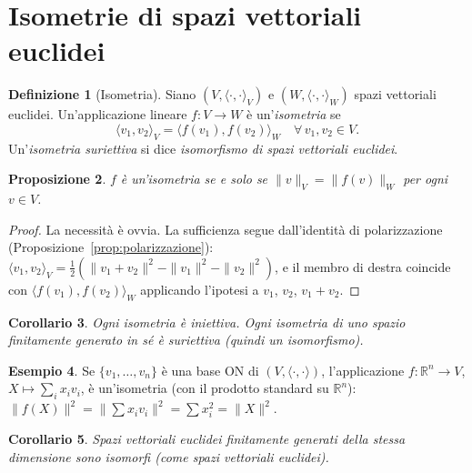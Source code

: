 \documentclass[11pt, a4paper]{book}
\theoremstyle{definition}
\newtheorem{definizione}{Definizione}[section]
\newtheorem{esempio}[definizione]{Esempio}
\theoremstyle{plain}
\newtheorem{proposizione}[definizione]{Proposizione}
\newtheorem{corollario}[definizione]{Corollario}
\theoremstyle{remark}
\newcommand{\R}{\mathbb{R}}
\begin{document}
\section{Isometrie di spazi vettoriali euclidei}
\label{sec:isometrie}

\begin{defbox}
\begin{definizione}[Isometria]
\label{def:isometria}
Siano $(V,\langle\cdot,\cdot\rangle_V)$ e $(W,\langle\cdot,\cdot\rangle_W)$ spazi vettoriali euclidei. Un'applicazione lineare $f \colon V \to W$ è un'\emph{isometria} se
\[
  \langle v_1,v_2\rangle_V = \langle f(v_1),f(v_2)\rangle_W \quad\forall\,v_1,v_2 \in V.
\]
Un'\emph{isometria suriettiva} si dice \emph{isomorfismo di spazi vettoriali euclidei}.
\end{definizione}
\end{defbox}

\begin{proposizione}
\label{prop:isometria-norma}
$f$ è un'isometria se e solo se $\|v\|_V = \|f(v)\|_W$ per ogni $v \in V$.
\end{proposizione}

\begin{proof}
La necessità è ovvia. La sufficienza segue dall'identità di polarizzazione (Proposizione~\ref{prop:polarizzazione}): $\langle v_1,v_2\rangle_V = \frac{1}{2}(\|v_1+v_2\|^2 - \|v_1\|^2 - \|v_2\|^2)$, e il membro di destra coincide con $\langle f(v_1),f(v_2)\rangle_W$ applicando l'ipotesi a $v_1$, $v_2$, $v_1+v_2$.
\end{proof}

\begin{corollario}
Ogni isometria è iniettiva. Ogni isometria di uno spazio finitamente generato in sé è suriettiva (quindi un isomorfismo).
\end{corollario}

\begin{exbox}
\begin{esempio}
Se $\{v_1,\ldots,v_n\}$ è una base ON di $(V,\langle\cdot,\cdot\rangle)$, l'applicazione $f \colon \R^n \to V$, $X \mapsto \sum_i x_i v_i$, è un'isometria (con il prodotto standard su $\R^n$): $\|f(X)\|^2 = \|\sum x_i v_i\|^2 = \sum x_i^2 = \|X\|^2$.
\end{esempio}
\end{exbox}

\begin{corollario}
Spazi vettoriali euclidei finitamente generati della stessa dimensione sono isomorfi (come spazi vettoriali euclidei).
\end{corollario}
\end{document}
